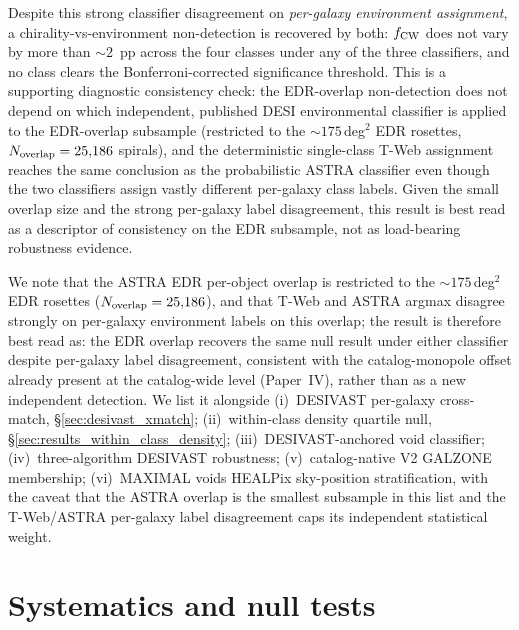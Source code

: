 \documentclass[twocolumn,linenumbers]{aastex702}
\begin{document}
Despite this strong classifier disagreement on \emph{per-galaxy
environment assignment}, a chirality-vs-environment non-detection
is recovered by both: $f_{\rm CW}$ does not vary by more
than $\sim\!2$~pp across the four classes under any of the three
classifiers, and no class clears the Bonferroni-corrected significance
threshold. This is a supporting diagnostic consistency check: the
EDR-overlap non-detection does not depend on which independent, published DESI environmental
classifier is applied to the EDR-overlap subsample (restricted to the
$\sim\!175$\,deg$^2$ EDR rosettes, $N_{\rm overlap}=25{,}186$ spirals),
and the deterministic single-class T-Web assignment reaches the same
conclusion as the probabilistic ASTRA classifier even though the two
classifiers assign vastly different per-galaxy class labels. Given the
small overlap size and the strong per-galaxy label disagreement, this
result is best read as a descriptor of consistency on the EDR subsample,
not as load-bearing robustness evidence.

We note that the ASTRA EDR
per-object overlap is restricted to the $\sim\!175$\,deg$^2$ EDR
rosettes ($N_{\rm overlap}=25{,}186$), and that T-Web and ASTRA argmax
disagree strongly on per-galaxy environment labels on this overlap;
the result is therefore best read as: the EDR overlap recovers the
same null result under either classifier despite per-galaxy label
disagreement, consistent with the catalog-monopole offset already
present at the catalog-wide level (Paper~IV), rather than as a new
independent detection. We list it alongside (i)~DESIVAST per-galaxy
cross-match, \S\ref{sec:desivast_xmatch}; (ii)~within-class density
quartile null, \S\ref{sec:results_within_class_density};
(iii)~DESIVAST-anchored void classifier;
(iv)~three-algorithm DESIVAST robustness;
(v)~catalog-native V2 GALZONE membership;
(vi)~MAXIMAL voids HEALPix sky-position stratification, with the
caveat that the ASTRA overlap is the smallest subsample in this
list and the T-Web/ASTRA per-galaxy label disagreement caps its
independent statistical weight.

\section{Systematics and null tests}\label{sec:systematics}
\end{document}
